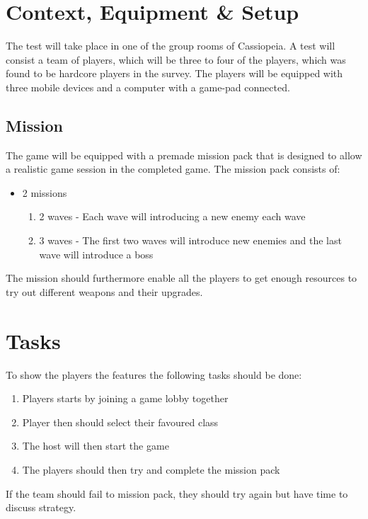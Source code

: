 \section{Context, Equipment \& Setup}
The test will take place in one of the group rooms of Cassiopeia.
A test will consist a team of players, which will be three to four of the players, which was found to be hardcore players in the survey.
The players will be equipped with three mobile devices and a computer with a game-pad connected.

\subsection{Mission}
The game will be equipped with a premade mission pack that is designed to allow a realistic game session in the completed game.
The mission pack consists of:
\begin{itemize}
	\item 2 missions
	\begin{enumerate}
		\item 2 waves - Each wave will introducing a new enemy each wave
		\item 3 waves - The first two waves will introduce new enemies and the last wave will introduce a boss
	\end{enumerate}
\end{itemize}
The mission should furthermore enable all the players to get enough resources to try out different weapons and their upgrades.

\section{Tasks}
To show the players the features the following tasks should be done:
\begin{enumerate}
\item Players starts by joining a game lobby together
\item Player then should select their favoured class
\item The host will then start the game
\item The players should then try and complete the mission pack
\end{enumerate}
If the team should fail to mission pack, they should try again but have time to discuss strategy.

